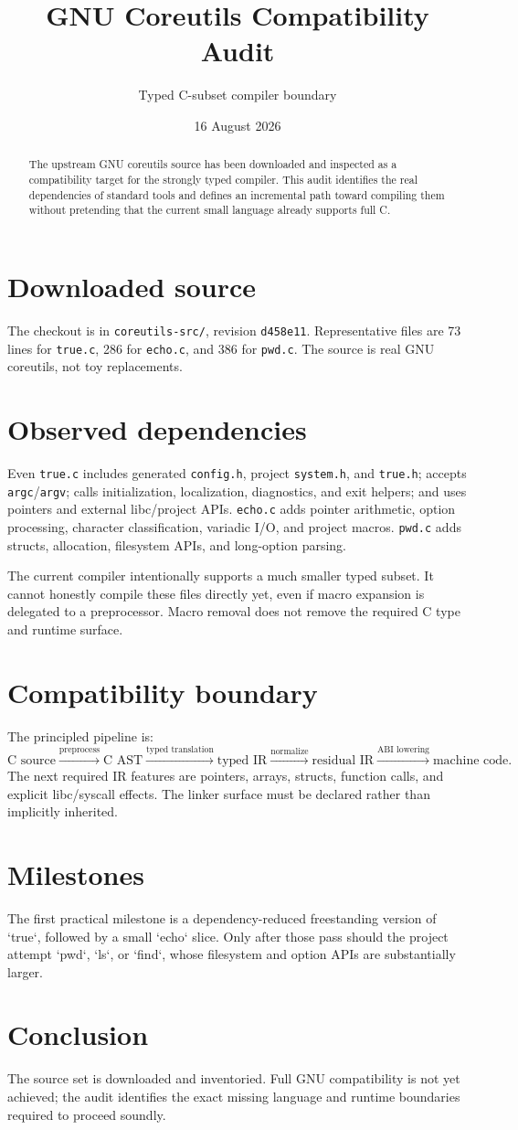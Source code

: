 \documentclass[11pt,a4paper]{article}
\title{GNU Coreutils Compatibility Audit}
\author{Typed C-subset compiler boundary}
\date{16 August 2026}
\begin{document}
\maketitle
\begin{abstract}
The upstream GNU coreutils source has been downloaded and inspected as a compatibility target for the strongly typed compiler. This audit identifies the real dependencies of standard tools and defines an incremental path toward compiling them without pretending that the current small language already supports full C.
\end{abstract}
\section{Downloaded source}
The checkout is in \texttt{coreutils-src/}, revision \texttt{d458e11}. Representative files are 73 lines for \texttt{true.c}, 286 for \texttt{echo.c}, and 386 for \texttt{pwd.c}. The source is real GNU coreutils, not toy replacements.
\section{Observed dependencies}
Even \texttt{true.c} includes generated \texttt{config.h}, project \texttt{system.h}, and \texttt{true.h}; accepts \texttt{argc}/\texttt{argv}; calls initialization, localization, diagnostics, and exit helpers; and uses pointers and external libc/project APIs. \texttt{echo.c} adds pointer arithmetic, option processing, character classification, variadic I/O, and project macros. \texttt{pwd.c} adds structs, allocation, filesystem APIs, and long-option parsing.

The current compiler intentionally supports a much smaller typed subset. It cannot honestly compile these files directly yet, even if macro expansion is delegated to a preprocessor. Macro removal does not remove the required C type and runtime surface.
\section{Compatibility boundary}
The principled pipeline is:
\[
\text{C source}\xrightarrow{\text{preprocess}}\text{C AST}\xrightarrow{\text{typed translation}}\text{typed IR}\xrightarrow{\text{normalize}}\text{residual IR}\xrightarrow{\text{ABI lowering}}\text{machine code}.
\]
The next required IR features are pointers, arrays, structs, function calls, and explicit libc/syscall effects. The linker surface must be declared rather than implicitly inherited.
\section{Milestones}
The first practical milestone is a dependency-reduced freestanding version of `true`, followed by a small `echo` slice. Only after those pass should the project attempt `pwd`, `ls`, or `find`, whose filesystem and option APIs are substantially larger.
\section{Conclusion}
The source set is downloaded and inventoried. Full GNU compatibility is not yet achieved; the audit identifies the exact missing language and runtime boundaries required to proceed soundly.
\end{document}
